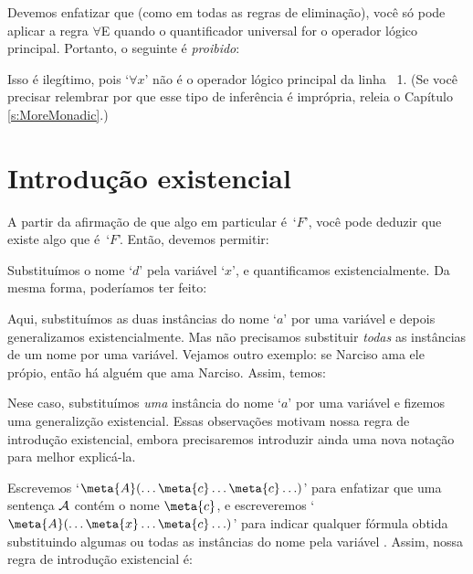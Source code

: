 Devemos enfatizar que (como em todas as regras de elimina\c c\~ao), voc\^e s\'o pode aplicar a regra $\forall$E quando o quantificador universal for o operador l\'ogico principal. Portanto, o seguinte \'e \emph{proibido}:
\begin{fitchproof}
\end{fitchproof}
Isso \'e ileg\'itimo, pois `$\forall x$' n\~ao \'e o  operador l\'ogico principal da linha ~1. (Se voc\^e precisar relembrar por que esse tipo de infer\^encia \'e impr\'opria, releia o  Capítulo \ref{s:MoreMonadic}.)


\section{Introdu\c c\~ao existencial}
A partir da afirma\c c\~ao de que algo em particular \'e~`$F$', voc\^e pode deduzir que existe algo que \'e~`$F$'. Ent\~ao, devemos permitir:
\begin{fitchproof}
	 
\end{fitchproof}
 
Substitu\'imos o nome `$d$' pela vari\'avel `$x$',  e  quantificamos existencialmente. Da mesma forma,  poder\'iamos ter feito:
\begin{fitchproof}
	 
\end{fitchproof}
Aqui,  substitu\'imos as duas inst\^ancias do nome `$a$' por uma vari\'avel e depois generalizamos existencialmente. Mas n\~ao precisamos substituir  \emph{todas}  as inst\^ancias de um nome por  uma vari\'avel.  Vejamos outro exemplo: se Narciso ama ele pr\'opio, ent\~ao h\'a algu\'em que ama Narciso. Assim, temos:
\begin{fitchproof}
	 
\end{fitchproof}
Nese caso, substitu\'imos \emph{uma} inst\^ancia do nome `$a$' por uma vari\'avel   e  fizemos uma  generaliz\c c\~ao  existencial. Essas observa\c c\~oes motivam nossa regra de introdu\c c\~ao existencial,  embora  precisaremos introduzir ainda uma nova nota\c c\~ao  para melhor explic\'a-la.

Escrevemos  `$\meta{A}(\ldots \meta{c} \ldots \meta{c}\ldots)$' para enfatizar que uma senten\c ca
 $\mathcal{A}$ cont\'em o nome $\meta{c}$,  e escreveremos `$\meta{A}(\ldots \meta{x} \ldots \meta{c}\ldots)$' para indicar qualquer f\'ormula obtida substituindo algumas ou todas as inst\^ancias do nome   pela vari\'avel .  Assim, nossa regra de introdu\c c\~ao existencial \'e:
 

